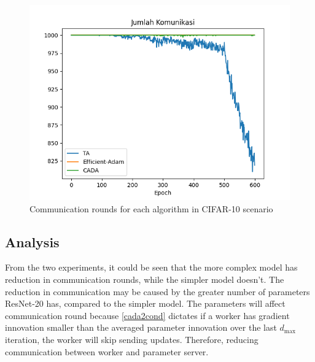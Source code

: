 \begin{figure}[htbp]
  \centering
  \includegraphics[width=0.8\columnwidth]{resources/resnet_comms.png}
  \caption{\label{resnetcomms1}Communication rounds for each algorithm in CIFAR-10 scenario}
\end{figure}

\subsection{Analysis}
From the two experiments, it could be seen that the more complex model has reduction in communication rounds, while the simpler model doesn't. The reduction in communication may be caused by the greater number of parameters ResNet-20 has, compared to the simpler model. The parameters will affect communication round because \autoref{cada2cond} dictates if a worker has gradient innovation smaller than the averaged parameter innovation over the last $d_\mathrm{max}$ iteration, the worker will skip sending updates. Therefore, reducing communication between worker and parameter server.
